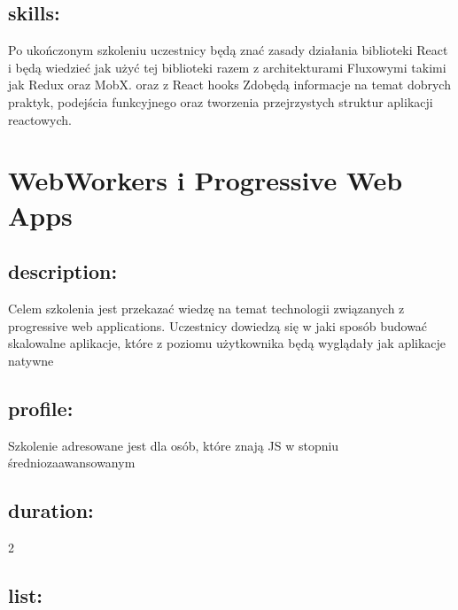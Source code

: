 \documentclass{article}[10pt]
\begin{document}
	\subsection*{skills:}
\begin{adjustwidth}{2cm}{}
	
Po ukończonym szkoleniu uczestnicy będą znać zasady działania biblioteki React i będą wiedzieć jak użyć tej biblioteki razem z architekturami Fluxowymi takimi jak Redux oraz MobX. oraz z React hooks Zdobędą informacje na temat dobrych praktyk, podejścia funkcyjnego oraz tworzenia przejrzystych struktur aplikacji reactowych.

\end{adjustwidth}

\newpage


    
	\section{WebWorkers i Progressive Web Apps}

	\subsection*{description:}
	\begin{adjustwidth}{2cm}{}
		Celem szkolenia jest przekazać wiedzę na temat technologii związanych z progressive web applications. Uczestnicy dowiedzą się w jaki sposób budować skalowalne aplikacje, które z poziomu użytkownika będą wyglądały jak aplikacje natywne
	\end{adjustwidth}
	\subsection*{profile:}
\begin{adjustwidth}{2cm}{}
	Szkolenie adresowane jest dla osób, które znają JS w stopniu średniozaawansowanym
\end{adjustwidth}
	\subsection*{duration:}
\begin{adjustwidth}{2cm}{}
	2
\end{adjustwidth}

	\subsection*{list:}
\begin{adjustwidth}{1.5cm}{}
	\begin{itemize}







	\end{itemize}
\end{adjustwidth}
\end{document}

